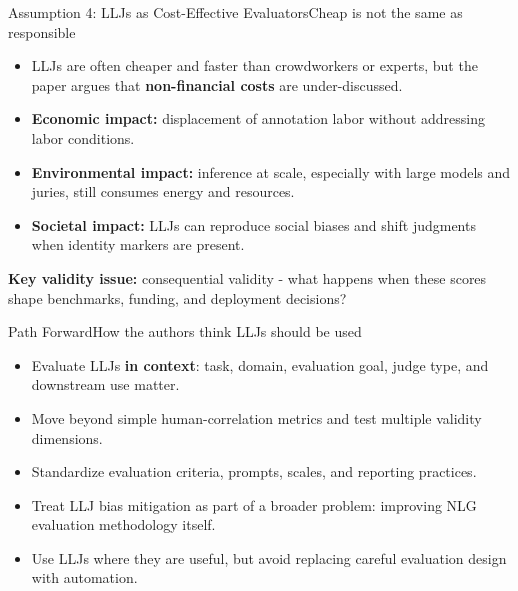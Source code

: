 \documentclass[10pt]{beamer}
\begin{document}
	\begin{frame}{Assumption 4: LLJs as Cost-Effective Evaluators}{Cheap is not the same as responsible}
		\begin{itemize}
			\item LLJs are often cheaper and faster than crowdworkers or experts, but the paper argues that \textbf{non-financial costs} are under-discussed.
			\item \textbf{Economic impact:} displacement of annotation labor without addressing labor conditions.
			\item \textbf{Environmental impact:} inference at scale, especially with large models and juries, still consumes energy and resources.
			\item \textbf{Societal impact:} LLJs can reproduce social biases and shift judgments when identity markers are present.
		\end{itemize}
		\vspace{0.2cm}
		\textbf{Key validity issue:} consequential validity - what happens when these scores shape benchmarks, funding, and deployment decisions?
	\end{frame}
	
	\begin{frame}{Path Forward}{How the authors think LLJs should be used}
		\begin{itemize}
			\item Evaluate LLJs \textbf{in context}: task, domain, evaluation goal, judge type, and downstream use matter.
			\item Move beyond simple human-correlation metrics and test multiple validity dimensions.
			\item Standardize evaluation criteria, prompts, scales, and reporting practices.
			\item Treat LLJ bias mitigation as part of a broader problem: improving NLG evaluation methodology itself.
			\item Use LLJs where they are useful, but avoid replacing careful evaluation design with automation.
		\end{itemize}
	\end{frame}
	
\end{document}
